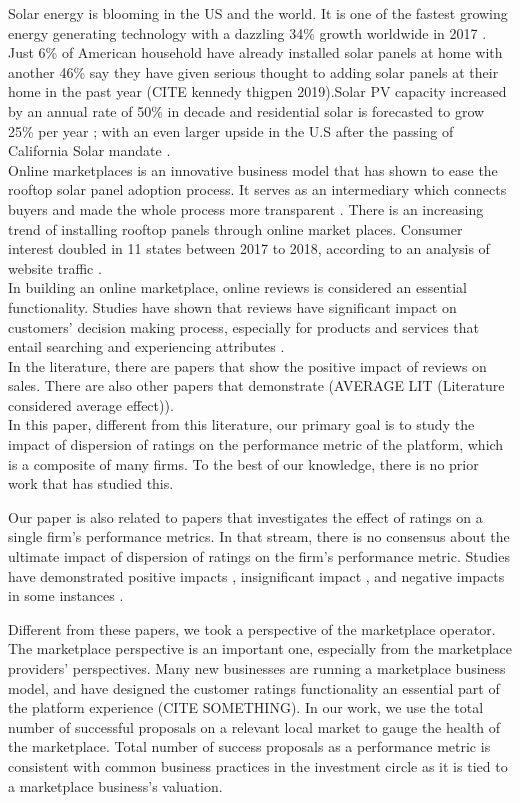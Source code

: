 \documentclass[msom,blindrev]{informs3}
\begin{document}
Solar energy is blooming in the US and the world. It is one of the fastest growing energy generating technology with a dazzling 34\% growth worldwide in 2017 \citep{iea2018snapshot}. Just 6\% of American household have already installed solar panels at home with another 46\% say they have given serious thought to adding solar panels at their home in the past year (CITE kennedy thigpen 2019).Solar PV capacity increased by an annual rate of 50\%  in decade and residential solar is forecasted to grow 25\% per year \citep{weaver_2019,seia}; with an even larger upside in the U.S after the passing of California Solar mandate \citep{gtmsolar2018}. \\
Online marketplaces is an innovative business model that has shown to ease the rooftop solar panel adoption process. It serves as an intermediary which connects buyers and made the whole process more transparent \citep{dorsey2019access}. There is an increasing trend of installing rooftop panels through online market places. Consumer interest doubled in 11 states between 2017 to 2018, according to an analysis of website traffic \citep{energysageintel19}.  \\
In building an online marketplace, online reviews is considered an essential functionality. Studies have shown that reviews have significant impact on customers'  decision making process, especially for products and services that entail searching and experiencing attributes \citep{zimmermann2018decomposing}.  \\
In the literature, there are papers that show the positive impact of reviews on sales. There are also other papers that demonstrate  (AVERAGE LIT (Literature considered average effect)).\\
In this paper, different from this literature, our primary goal is to study the impact of dispersion of ratings on the  performance metric of the platform, which is a composite of many firms. To the best of our knowledge, there is no prior work that has studied this.

Our paper is also related to papers that investigates the effect of ratings on a single firm's performance metrics. In that stream, there is no consensus about the ultimate impact of dispersion of ratings on the firm's performance metric. Studies have demonstrated positive impacts \citep{chintagunta2010effects,chevalier2006effect,dellarocas2007exploring}, insignificant impact \citep{duan2008online}, and negative impacts in some instances \citep{wang2015user}.

Different from these papers, we took a perspective of the marketplace operator. The marketplace perspective is an important one, especially from the marketplace providers' perspectives. Many new businesses are running a marketplace business model, and have designed the customer ratings functionality an essential part of the platform experience (CITE SOMETHING). In our work, we use the total number of successful proposals on a relevant local market to gauge the health of the marketplace. Total number of success proposals as a performance metric is consistent with common business practices in the investment circle \citep{boris_2018,galston_2017} as it is tied to a marketplace business's valuation. \\
\end{document}
